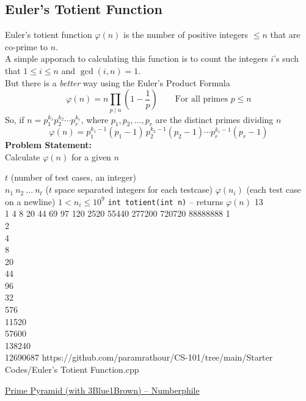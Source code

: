 \documentclass[../../Problems]{subfiles}
\begin{document}
\subsection{Euler's Totient Function}\label{pp:eulertotient}
Euler's totient function $\varphi(n)$ is the number of positive integers $\leq n$ that are co-prime to $n$.\\
A simple apporach to calculating this function is to count the integers $i$'s such that $1\leq i\leq n$ and $\gcd(i,n) = 1$.\\
But there is a \emph{better} way using the Euler's Product Formula
\begin{equation}
	\varphi (n)=n\prod _{p\mid n}\left(1-{\frac {1}{p}}\right)\qquad\text{For all primes $p\leq n$}
\end{equation}
So, if  ${\displaystyle n=p_{1}^{k_{1}}p_{2}^{k_{2}}\cdots p_{r}^{k_{r}}}$, where ${\displaystyle p_{1},p_{2},\ldots ,p_{r}}$ are the distinct primes dividing $n$
\begin{equation*}
	{\displaystyle \varphi (n)=p_{1}^{k_{1}-1}(p_{1}{-}1)\,p_{2}^{k_{2}-1}(p_{2}{-}1)\cdots p_{r}^{k_{r}-1}(p_{r}{-}1)}
\end{equation*}
\textbf{Problem Statement:}\\
Calculate $\varphi(n)$ for a given $n$

\begin{testcasesFunction}
	{$t$ \hfill(number of test cases, an integer)\\
	$n_1\ n_2\ \ldots\ n_t$ \hfill($t$ space separated integers for each testcase)}
	{$\varphi(n_i)$ \hfill(each test case on a newline)}
	{$1 < n_i \leq 10^{9}$}
	{\texttt{int totient(int n)} -- returns $\varphi(n)$}
	{13\\1 4 8 20 44 69 97 120 2520 55440 277200 720720 88888888}
	{1\\2\\4\\8\\20\\44\\96\\32\\576\\11520\\57600\\138240\\12690687}
	{https://github.com/paramrathour/CS-101/tree/main/Starter Codes/Euler's Totient Function.cpp}
\end{testcasesFunction}
\begin{funvideo}
\href{https://youtu.be/NsjsLwYRW8o}{Prime Pyramid (with 3Blue1Brown) -- Numberphile}
\end{funvideo}
\end{document}

